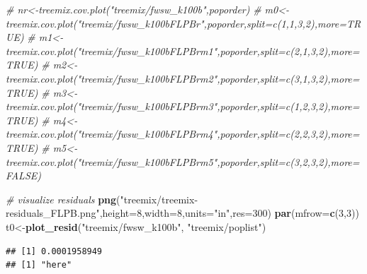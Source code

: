 \documentclass[]{article}
\newenvironment{Shaded}{\begin{snugshade}}{\end{snugshade}}
\newcommand{\KeywordTok}[1]{\textcolor[rgb]{0.13,0.29,0.53}{\textbf{#1}}}
\newcommand{\DataTypeTok}[1]{\textcolor[rgb]{0.13,0.29,0.53}{#1}}
\newcommand{\DecValTok}[1]{\textcolor[rgb]{0.00,0.00,0.81}{#1}}
\newcommand{\StringTok}[1]{\textcolor[rgb]{0.31,0.60,0.02}{#1}}
\newcommand{\CommentTok}[1]{\textcolor[rgb]{0.56,0.35,0.01}{\textit{#1}}}
\newcommand{\NormalTok}[1]{#1}
\begin{document}
\begin{Shaded}
\begin{Highlighting}[]
\CommentTok{# nr<-treemix.cov.plot("treemix/fwsw_k100b",poporder)}
\CommentTok{# m0<-treemix.cov.plot("treemix/fwsw_k100bFLPBr",poporder,split=c(1,1,3,2),more=TRUE)}
\CommentTok{# m1<-treemix.cov.plot("treemix/fwsw_k100bFLPBrm1",poporder,split=c(2,1,3,2),more=TRUE)}
\CommentTok{# m2<-treemix.cov.plot("treemix/fwsw_k100bFLPBrm2",poporder,split=c(3,1,3,2),more=TRUE)}
\CommentTok{# m3<-treemix.cov.plot("treemix/fwsw_k100bFLPBrm3",poporder,split=c(1,2,3,2),more=TRUE)}
\CommentTok{# m4<-treemix.cov.plot("treemix/fwsw_k100bFLPBrm4",poporder,split=c(2,2,3,2),more=TRUE)}
\CommentTok{# m5<-treemix.cov.plot("treemix/fwsw_k100bFLPBrm5",poporder,split=c(3,2,3,2),more=FALSE)}
\end{Highlighting}
\end{Shaded}

\begin{Shaded}
\begin{Highlighting}[]
\CommentTok{# visualize residuals}
\KeywordTok{png}\NormalTok{(}\StringTok{"treemix/treemix-residuals_FLPB.png"}\NormalTok{,}\DataTypeTok{height=}\DecValTok{8}\NormalTok{,}\DataTypeTok{width=}\DecValTok{8}\NormalTok{,}\DataTypeTok{units=}\StringTok{"in"}\NormalTok{,}\DataTypeTok{res=}\DecValTok{300}\NormalTok{)}
\KeywordTok{par}\NormalTok{(}\DataTypeTok{mfrow=}\KeywordTok{c}\NormalTok{(}\DecValTok{3}\NormalTok{,}\DecValTok{3}\NormalTok{))}
\NormalTok{t0<-}\KeywordTok{plot_resid}\NormalTok{(}\StringTok{"treemix/fwsw_k100b"}\NormalTok{,  }\StringTok{"treemix/poplist"}\NormalTok{)}
\end{Highlighting}
\end{Shaded}

\begin{verbatim}
## [1] 0.0001958949
## [1] "here"
\end{verbatim}
\end{document}
